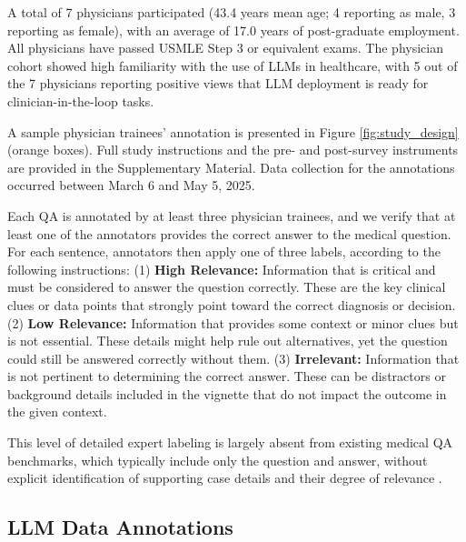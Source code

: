 \documentclass[fleqn,10pt]{wlscirep}
\begin{document}
A total of 7 physicians participated (43.4 years mean age; 4 reporting as male, 3 reporting as female), with an average of 17.0 years of post-graduate employment. All physicians have passed USMLE Step 3 or equivalent exams. The physician cohort showed high familiarity with the use of LLMs in healthcare, with 5 out of the 7 physicians reporting positive views that LLM deployment is ready for clinician-in-the-loop tasks.

A sample physician trainees' annotation is presented in Figure \ref{fig:study_design} (orange boxes). Full study instructions and the pre- and post-survey instruments are provided in the Supplementary Material. Data collection for the annotations occurred between March 6 and May 5, 2025.


Each QA is annotated by at least three physician trainees, and we verify that at least one of the annotators provides the correct answer to the medical question. For each sentence, annotators then apply one of three labels, according to the following instructions: (1) \textbf{High Relevance:} Information that is critical and must be considered to answer the question correctly. These are the key clinical clues or data points that strongly point toward the correct diagnosis or decision. (2) \textbf{Low Relevance:} Information that provides some context or minor clues but is not essential. These details might help rule out alternatives, yet the question could still be answered correctly without them. (3) \textbf{Irrelevant:} Information that is not pertinent to determining the correct answer. These can be distractors or background details included in the vignette that do not impact the outcome in the given context.

This level of detailed expert labeling is largely absent from existing medical QA benchmarks, which typically include only the question and answer, without explicit identification of supporting case details and their degree of relevance \cite{chen_benchmarking_2025}.

\subsection{LLM Data Annotations}
\end{document}
